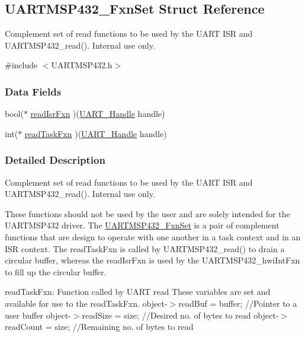 \subsection{U\+A\+R\+T\+M\+S\+P432\+\_\+\+Fxn\+Set Struct Reference}
\label{struct_u_a_r_t_m_s_p432___fxn_set}


Complement set of read functions to be used by the U\+A\+R\+T I\+S\+R and U\+A\+R\+T\+M\+S\+P432\+\_\+read(). Internal use only.  




{\ttfamily \#include $<$U\+A\+R\+T\+M\+S\+P432.\+h$>$}

\subsubsection*{Data Fields}
\begin{DoxyCompactItemize}
\item 
bool($\ast$ \hyperlink{struct_u_a_r_t_m_s_p432___fxn_set_a36c8cc2c79e05138ab96e95b4b090fcf}{read\+Isr\+Fxn} )(\hyperlink{_u_a_r_t_8h_a13cc669fae768d8212e6491ce71b28af}{U\+A\+R\+T\+\_\+\+Handle} handle)
\item 
int($\ast$ \hyperlink{struct_u_a_r_t_m_s_p432___fxn_set_a037fc6ffa691eb4eff208a14271c67ae}{read\+Task\+Fxn} )(\hyperlink{_u_a_r_t_8h_a13cc669fae768d8212e6491ce71b28af}{U\+A\+R\+T\+\_\+\+Handle} handle)
\end{DoxyCompactItemize}


\subsubsection{Detailed Description}
Complement set of read functions to be used by the U\+A\+R\+T I\+S\+R and U\+A\+R\+T\+M\+S\+P432\+\_\+read(). Internal use only. 

These functions should not be used by the user and are solely intended for the U\+A\+R\+T\+M\+S\+P432 driver. The \hyperlink{struct_u_a_r_t_m_s_p432___fxn_set}{U\+A\+R\+T\+M\+S\+P432\+\_\+\+Fxn\+Set} is a pair of complement functions that are design to operate with one another in a task context and in an I\+S\+R context. The read\+Task\+Fxn is called by U\+A\+R\+T\+M\+S\+P432\+\_\+read() to drain a circular buffer, whereas the read\+Isr\+Fxn is used by the U\+A\+R\+T\+M\+S\+P432\+\_\+hwi\+Int\+Fxn to fill up the circular buffer.

read\+Task\+Fxn\+: Function called by U\+A\+R\+T read These variables are set and available for use to the read\+Task\+Fxn. object-\/$>$read\+Buf = buffer; //\+Pointer to a user buffer object-\/$>$read\+Size = size; //\+Desired no. of bytes to read object-\/$>$read\+Count = size; //\+Remaining no. of bytes to read

